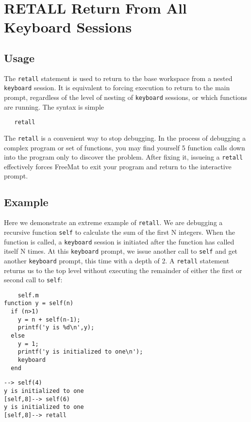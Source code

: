 \section{RETALL Return From All Keyboard Sessions}

\subsection{Usage}

The \verb|retall| statement is used to return to the base workspace
from a nested \verb|keyboard| session.  It is equivalent to forcing
execution to return to the main prompt, regardless of the level
of nesting of \verb|keyboard| sessions, or which functions are 
running.  The syntax is simple
\begin{verbatim}
   retall
\end{verbatim}
The \verb|retall| is a convenient way to stop debugging.  In the
process of debugging a complex program or set of functions,
you may find yourself 5 function calls down into the program
only to discover the problem.  After fixing it, issueing
a \verb|retall| effectively forces FreeMat to exit your program
and return to the interactive prompt.
\subsection{Example}

Here we demonstrate an extreme example of \verb|retall|.  We
are debugging a recursive function \verb|self| to calculate the sum
of the first N integers.  When the function is called,
a \verb|keyboard| session is initiated after the function
has called itself N times.  At this \verb|keyboard| prompt,
we issue another call to \verb|self| and get another \verb|keyboard|
prompt, this time with a depth of 2.  A \verb|retall| statement
returns us to the top level without executing the remainder
of either the first or second call to \verb|self|:
\begin{verbatim}
    self.m
function y = self(n)
  if (n>1)
    y = n + self(n-1);
    printf('y is %d\n',y);
  else
    y = 1;
    printf('y is initialized to one\n');
    keyboard
  end
\end{verbatim}
\begin{verbatim}
--> self(4)
y is initialized to one
[self,8]--> self(6)
y is initialized to one
[self,8]--> retall
\end{verbatim}
